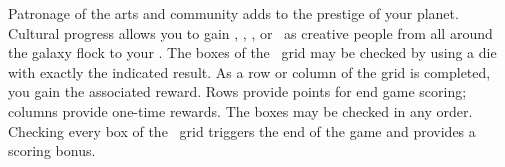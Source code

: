 Patronage of the arts and community adds to the prestige of your planet.  Cultural progress allows you to gain \currency, \population, \tech, or \happiness\ as creative people from all around the galaxy flock to your \planet.
\newline\newline
The boxes of the \culture\ grid may be checked by using a die with exactly the indicated result.  As a row or column of the grid is completed, you gain the associated reward.  Rows provide points for end game scoring; columns provide one-time rewards.  The boxes may be checked in any order.
Checking every box of the \culture\ grid triggers the end of the game and provides a scoring bonus.
